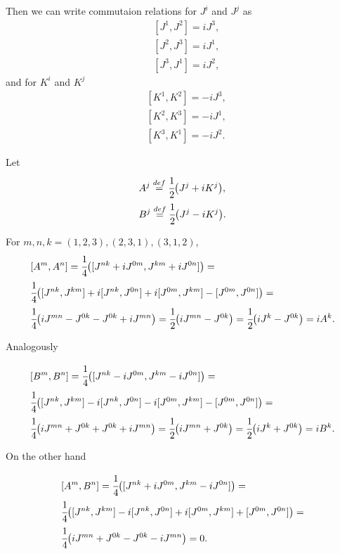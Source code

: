 \documentclass[main.tex]{subfiles}
\begin{document}
Then we can write commutaion relations for $J^i$ and $J^j$ as
\begin{align}
& [J^1, J^2] = i J^3,\\
& [J^2, J^3] = i J^1,\\
& [J^3, J^1] = i J^2,
\end{align}
and for $K^i$ and $K^j$
\begin{align}
& [K^1, K^2] = - i J^3,\\
& [K^2, K^3] = - i J^1,\\
& [K^3, K^1] = - i J^2.
\end{align}

Let 
\begin{align*}
& A^j \stackrel{def}{=} \cfrac{1}{2}\big(J^j + iK^j\big),\\
& B^j \stackrel{def}{=} \cfrac{1}{2}\big(J^j - iK^j\big).
\end{align*}

For $m, n, k = (1, 2, 3), (2, 3, 1), (3, 1, 2)$,
\begin{align*}
& [A^m, A^n] = \cfrac{1}{4}\big([J^{nk} + iJ^{0m}, J^{km} + iJ^{0n}]\big) = \\
& \cfrac{1}{4}\big([J^{nk}, J^{km}] + i[J^{nk}, J^{0n}] + i[J^{0m}, J^{km}] - [J^{0m}, J^{0n}]\big) = \\
& \cfrac{1}{4}\big(iJ^{mn} - J^{0k} - J^{0k} + iJ^{mn}\big) = 
\cfrac{1}{2}\big(iJ^{mn} - J^{0k}\big) = \cfrac{1}{2}\big(i J^{k} - J^{0k}\big) = iA^k.
\end{align*}

Analogously

\begin{align*}
& [B^m, B^n] = \cfrac{1}{4}\big([J^{nk} - iJ^{0m}, J^{km} - iJ^{0n}]\big) = \\
& \cfrac{1}{4}\big([J^{nk}, J^{km}] - i[J^{nk}, J^{0n}] - i[J^{0m}, J^{km}] - [J^{0m}, J^{0n}]\big) = \\
& \cfrac{1}{4}\big(iJ^{mn} + J^{0k} + J^{0k} + iJ^{mn}\big) = 
\cfrac{1}{2}\big(iJ^{mn} + J^{0k}\big) = \cfrac{1}{2}\big(i J^{k} + J^{0k}\big) = iB^k.
\end{align*}

On the other hand

\begin{align*}
& [A^m, B^n] = \cfrac{1}{4}\big([J^{nk} + iJ^{0m}, J^{km} - iJ^{0n}]\big) = \\
& \cfrac{1}{4}\big([J^{nk}, J^{km}] - i[J^{nk}, J^{0n}] + i[J^{0m}, J^{km}] + [J^{0m}, J^{0n}]\big) = \\
& \cfrac{1}{4}\big(iJ^{mn} + J^{0k} - J^{0k} - iJ^{mn}\big) = 0.
\end{align*}
\end{document}
